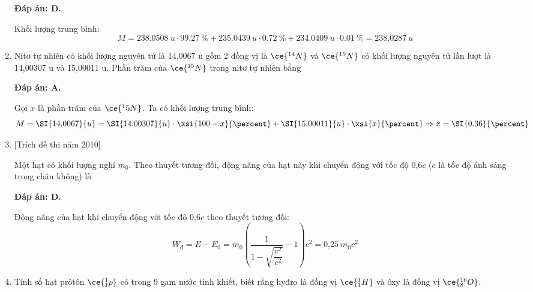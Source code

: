 \begin{enumerate}[label=\bfseries Câu \arabic*:]
	\loigiai
	{		\textbf{Đáp án: D.}
		
		Khối lượng trung bình:
		$$M=\SI{238.0508}{u} \cdot \SI{99.27}{\percent} + \SI{235.0439}{u} \cdot \SI{0.72}{\percent} + \SI{234.0409}{u} \cdot \SI{0.01}{\percent} = \SI{238.0287}{u}$$
		
	}
	\item {}
	\cauhoi
	{Nitơ tự nhiên có khối lượng nguyên tử là 14,0067 u gồm 2 đồng vị là $\ce{^{14} N}$ và $\ce{^{15} N}$ có khối lượng nguyên tử lần lượt là 14,00307 u và 15,00011 u. Phần trăm của $\ce{^{15} N}$ trong nitơ tự nhiên bằng
	}
	
	\loigiai
	{		\textbf{Đáp án: A.}
		
		Gọi $x$ là phần trăm của $\ce{^15 N}$. Ta có khối lượng trung bình:
		$$M=\SI{14.0067}{u}=\SI{14.00307}{u} \cdot \xsi{100-x}{\percent} + \SI{15.00011}{u} \cdot \xsi{x}{\percent} \Rightarrow x= \SI{0.36}{\percent}$$
		
	}
	\item {} [Trích đề thi năm 2010]
	\cauhoi
	{Một hạt có khối lượng nghỉ $m_0$. Theo thuyết tương đối, động năng của hạt này khi chuyển động với tốc độ $\text{0,6}c$ ($c$ là tốc độ ánh sáng trong chân không) là
	}
	
	\loigiai
	{		\textbf{Đáp án: D.}
		
		Động năng của hạt khi chuyển động với tốc độ $\text{0,6}c$ theo thuyết tương đối:
		$$W_\text{đ} =E-E_0=  m_0 \left(\dfrac{1}{1-\sqrt{\dfrac{v^2}{c^2}}}-1\right)c^2=\text{0,25}\ m_0c^2$$
		
	}
	\item {}
	\cauhoi
	{Tính số hạt prôtôn $\ce{^1_1 p}$ có trong 9 gam nước tinh khiết, biết rằng hyđro là đồng vị $\ce{^1_1 H}$ và ôxy là đồng vị $\ce{^{16}_8 O}$.
	}
	

\end{enumerate}
